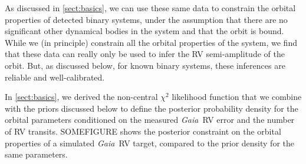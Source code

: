 \documentclass[modern, letterpaper]{aastex631}
\newcommand{\project}[1]{\textsl{#1}}
\newcommand{\Gaia}{\project{Gaia}}
\begin{document}
As discussed in \autoref{sect:basics}, we can use these same data to constrain the orbital properties of detected binary systems, under the assumption that there are no significant other dynamical bodies in the system and that the orbit is bound.
While we (in principle) constrain all the orbital properties of the system, we find that these data can really only be used to infer the RV semi-amplitude of the orbit.
But, as discussed below, for known binary systems, these inferences are reliable and well-calibrated.

In \autoref{sect:basics}, we derived the non-central $\chi^2$ likelihood function that we combine with the priors discussed below to define the posterior probability density for the orbital parameters conditioned on the measured \Gaia\ RV error and the number of RV transits.
SOMEFIGURE shows the posterior constraint on the orbital properties of a simulated \Gaia\ RV target, compared to the prior density for the same parameters.






\end{document}

